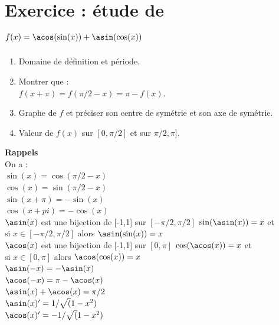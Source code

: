 \documentclass[a4paper,11pt]{book}
\begin{document}
\section{Exercice : \'etude de $\displaystyle f(x)=\acos(\sin(x))+\asin(\cos(x))$}
\begin{enumerate}
\item Domaine de d\'efinition et p\'eriode.\\
\item Montrer que :\\
$f(x+\pi)=f(\pi/2-x)=\pi-f(x)$.
\item Graphe de $f$ et pr\'eciser son centre de sym\'etrie et son axe de sym\'etrie.
\item Valeur de $f(x)$ sur $[0,\pi/2]$ et sur $\pi/2,\pi]$.
\end{enumerate}

{\bf Rappels}\\
On a :\\
$\sin(x)=\cos(\pi/2-x)$\\
$\cos(x)=\sin(\pi/2-x)$\\
$\sin(x+\pi)=-\sin(x)$\\
$\cos(x+pi)=-\cos(x)$\\
$\asin(x)$ est une bijection  de [-1,1] sur $[-\pi/2,\pi/2]$
$\sin(\asin(x))=x$  et \\
si $x\in [-\pi/2,\pi/2]$ alors $\asin(\sin(x))=x$\\
$\acos(x)$ est une bijection  de [-1,1] sur $[0,\pi]$
$\cos(\acos(x))=x$ et \\
si $x\in [0,\pi]$ alors $\acos(\cos(x))=x$\\
$\asin(-x)=-\asin(x)$\\
$\acos(-x)=\pi-\acos(x)$\\
$\asin(x)+\acos(x)=\pi/2$\\
$\asin(x)'=1/\sqrt(1-x^2)$\\
$\acos(x)'=-1/\sqrt(1-x^2)$\\
\end{document}
